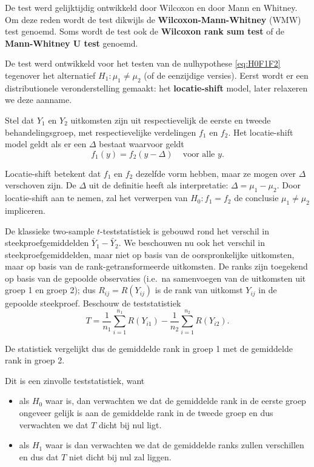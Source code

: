 \documentclass[12pt,dutch,coursenotes]{book}
\theoremstyle{definition}
\theoremstyle{definition}
\theoremstyle{definition}
\theoremstyle{remark}
\begin{document}
De test werd gelijktijdig ontwikkeld door Wilcoxon en door Mann en
Whitney. Om deze reden wordt de test dikwijls de
\textbf{Wilcoxon-Mann-Whitney} (WMW) test genoemd. Soms wordt de test
ook de \textbf{Wilcoxon rank sum test} of de \textbf{Mann-Whitney U
test} genoemd.

De test werd ontwikkeld voor het testen van de nulhypothese
\eqref{eq:H0F1F2} tegenover het alternatief \(H_1: \mu_1\neq \mu_2\) (of
de eenzijdige versies). Eerst wordt er een distributionele
veronderstelling gemaakt: het \textbf{locatie-shift} model, later
relaxeren we deze aanname.

Stel dat \(Y_1\) en \(Y_2\) uitkomsten zijn uit respectievelijk de
eerste en tweede behandelingsgroep, met respectievelijke verdelingen
\(f_1\) en \(f_2\). Het locatie-shift model geldt als er een \(\Delta\)
bestaat waarvoor geldt \[
   f_1(y)=f_2(y-\Delta) \;\;\;\text{ voor alle } y.
 \]

Locatie-shift betekent dat \(f_1\) en \(f_2\) dezelfde vorm hebben, maar
ze mogen over \(\Delta\) verschoven zijn. De \(\Delta\) uit de definitie
heeft als interpretatie: \(\Delta = \mu_1-\mu_2\). Door locatie-shift
aan te nemen, zal het verwerpen van \(H_0: f_1=f_2\) de conclusie
\(\mu_1\neq \mu_2\) impliceren.

De klassieke two-sample \(t\)-teststatistiek is gebouwd rond het
verschil in steekproefgemiddelden \(\bar{Y}_1-\bar{Y}_2\). We beschouwen
nu ook het verschil in steekproefgemiddelden, maar niet op basis van de
oorspronkelijke uitkomsten, maar op basis van de rank-getransformeerde
uitkomsten. De ranks zijn toegekend op basis van de gepoolde observaties
(i.e.~na samenvoegen van de uitkomsten uit groep 1 en groep 2); dus
\(R_{ij}=R(Y_{ij})\) is de rank van uitkomst \(Y_{ij}\) in de gepoolde
steekproef. Beschouw de teststatistiek \[
  T = \frac{1}{n_1}\sum_{i=1}^{n_1} R(Y_{i1}) - \frac{1}{n_2}\sum_{i=1}^{n_2} R(Y_{i2}) .
\]

De statistiek vergelijkt dus de gemiddelde rank in groep 1 met de
gemiddelde rank in groep 2.

Dit is een zinvolle teststatistiek, want

\begin{itemize}
\item
  als \(H_0\) waar is, dan verwachten we dat de gemiddelde rank in de
  eerste groep ongeveer gelijk is aan de gemiddelde rank in de tweede
  groep en dus verwachten we dat \(T\) dicht bij nul ligt.
\item
  als \(H_1\) waar is dan verwachten we dat de gemiddelde ranks zullen
  verschillen en dus dat \(T\) niet dicht bij nul zal liggen.
\end{itemize}
\end{document}
